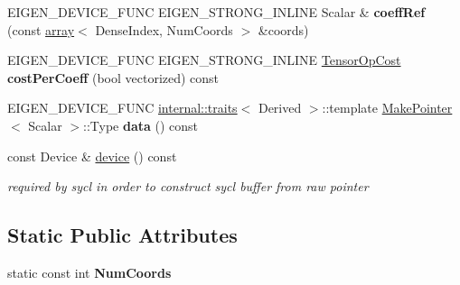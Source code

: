 \begin{DoxyCompactItemize}
E\+I\+G\+E\+N\+\_\+\+D\+E\+V\+I\+C\+E\+\_\+\+F\+U\+NC E\+I\+G\+E\+N\+\_\+\+S\+T\+R\+O\+N\+G\+\_\+\+I\+N\+L\+I\+NE Scalar \& {\bfseries coeff\+Ref} (const \hyperlink{class_eigen_1_1array}{array}$<$ Dense\+Index, Num\+Coords $>$ \&coords)
\item 
\mbox{\label{struct_eigen_1_1_tensor_evaluator_af3251d42e115c7c14f7c82a68a3b799d}} 
E\+I\+G\+E\+N\+\_\+\+D\+E\+V\+I\+C\+E\+\_\+\+F\+U\+NC E\+I\+G\+E\+N\+\_\+\+S\+T\+R\+O\+N\+G\+\_\+\+I\+N\+L\+I\+NE \hyperlink{class_eigen_1_1_tensor_op_cost}{Tensor\+Op\+Cost} {\bfseries cost\+Per\+Coeff} (bool vectorized) const
\item 
\mbox{\label{struct_eigen_1_1_tensor_evaluator_a2eea86ebd5046050b35b417a17a0e749}} 
E\+I\+G\+E\+N\+\_\+\+D\+E\+V\+I\+C\+E\+\_\+\+F\+U\+NC \hyperlink{struct_eigen_1_1internal_1_1traits}{internal\+::traits}$<$ Derived $>$\+::template \hyperlink{struct_eigen_1_1_make_pointer}{Make\+Pointer}$<$ Scalar $>$\+::Type {\bfseries data} () const
\item 
\mbox{\label{struct_eigen_1_1_tensor_evaluator_a98b51809ed8f7a1f736eb7b952b9636e}} 
const Device \& \hyperlink{struct_eigen_1_1_tensor_evaluator_a98b51809ed8f7a1f736eb7b952b9636e}{device} () const
\begin{DoxyCompactList}\small\item\em required by sycl in order to construct sycl buffer from raw pointer \end{DoxyCompactList}\end{DoxyCompactItemize}
\subsection*{Static Public Attributes}
\begin{DoxyCompactItemize}
\item 
static const int {\bfseries Num\+Coords}
\end{DoxyCompactItemize}
